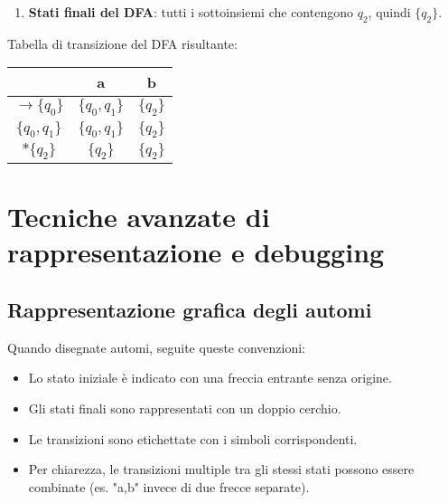 \documentclass[12pt,a4paper]{article}
\begin{document}
\begin{risoluzione}
\begin{enumerate}
  \item \textbf{Stati finali del DFA}: tutti i sottoinsiemi che contengono $q_2$, quindi $\{q_2\}$.
\end{enumerate}

\begin{figure}[h]
\centering
{}
\end{figure}

Tabella di transizione del DFA risultante:
\begin{center}
\begin{tabular}{c|cc}
 & a & b \\
\hline
$\rightarrow \{q_0\}$ & $\{q_0, q_1\}$ & $\{q_2\}$ \\
$\{q_0, q_1\}$ & $\{q_0, q_1\}$ & $\{q_2\}$ \\
$\ast \{q_2\}$ & $\{q_2\}$ & $\{q_2\}$ \\
\end{tabular}
\end{center}
\end{risoluzione}

\section{Tecniche avanzate di rappresentazione e debugging}

\subsection{Rappresentazione grafica degli automi}

Quando disegnate automi, seguite queste convenzioni:
\begin{itemize}
  \item Lo stato iniziale è indicato con una freccia entrante senza origine.
  \item Gli stati finali sono rappresentati con un doppio cerchio.
  \item Le transizioni sono etichettate con i simboli corrispondenti.
  \item Per chiarezza, le transizioni multiple tra gli stessi stati possono essere combinate (es. "a,b" invece di due frecce separate).
\end{itemize}
\end{document}
